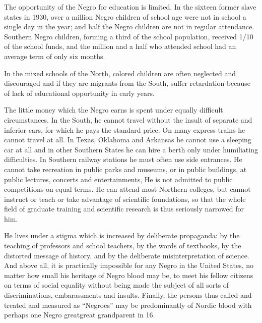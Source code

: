 \documentclass[letterpaper,10pt,english]{jupyterBook}
\begin{document}
\sphinxAtStartPar
The opportunity of the Negro for education is limited. In the sixteen former slave states in 1930, over a million Negro children of school age were not in school a single day in the year; and half the Negro children are not in regular attendance. Southern Negro children, forming a third of the school population, received 1/10 of the school funds, and the million and a half who attended school had an average term of only six months.

\sphinxAtStartPar
In the mixed schools of the North, colored children are often neglected and discouraged and if they are migrants from the South, suffer retardation because of lack of educational opportunity in early years.

\sphinxAtStartPar
The little money which the Negro earns is spent under equally difficult circumstances. In the South, he cannot travel without the insult of separate and inferior cars, for which he pays the standard price. On many express trains he cannot travel at all. In Texas, Oklahoma and Arkansas he cannot use a sleeping car at all and in other Southern States he can hire a berth only under humiliating difficulties. In Southern railway stations he must often use side entrances. He cannot take recreation in public parks and museums, or in public buildings, at public lectures, concerts and entertainments, He is not admitted to public competitions on equal terms. He can attend most Northern colleges, but cannot instruct or teach or take advantage of scientific foundations, so that the whole field of graduate training and scientific research is thus seriously narrowed for him.

\sphinxAtStartPar
He lives under a stigma which is increased by deliberate propaganda: by the teaching of professors and school teachers, by the words of textbooks, by the distorted message of history, and by the deliberate misinterpretation of science. And above all, it is practically impossible for any Negro in the United States, no matter how small his heritage of Negro blood may be, to meet his fellow citizens on terms of social equality without being made the subject of all sorts of discriminations, embarassments and insults. Finally, the persons thus called and treated and measured as “Negroes” may be predominantly of Nordic blood with perhaps one Negro great\sphinxhyphen{}great grandparent in 16.
\end{document}
